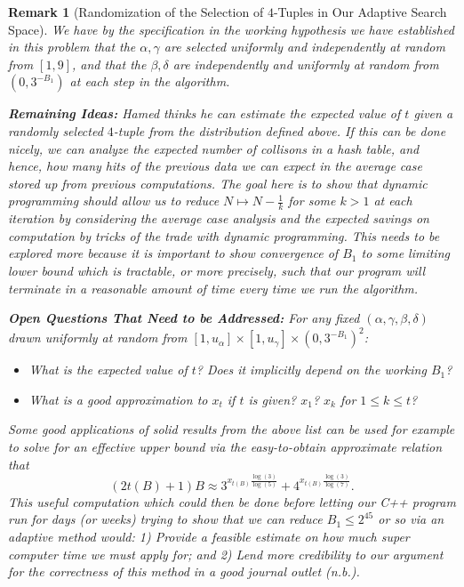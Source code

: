 \documentclass[12pt]{article}
\newtheorem{remark}[theorem]{Remark}
\begin{document}
\begin{remark}[Randomization of the Selection of $4$-Tuples in Our Adaptive Search Space] 
We have by the specification in the working hypothesis we have established in this problem that the 
$\alpha,\gamma$ are selected uniformly and independently at random from $[1, 9]$, and that the 
$\beta,\delta$ are independently and uniformly at random from $(0, 3^{-B_1})$ at each step in the 
algorithm. 

\noindent
\textbf{Remaining Ideas:} 
Hamed thinks he can estimate the expected value of $t$ given a randomly selected $4$-tuple from the 
distribution defined above. If this can be done nicely, we can analyze the expected number of collisons in a 
hash table, and hence, how many hits of the previous data we can expect in the average case stored up from 
previous computations. \emph{The goal here is to show that dynamic programming should allow us to reduce 
$N \mapsto N-\frac{1}{k}$ for some $k > 1$ at each iteration by considering the average case analysis and the 
expected savings on computation by tricks of the trade with dynamic programming.} This needs to be 
explored more because it is important to show convergence of $B_1$ to some limiting lower bound which is 
tractable, or more precisely, such that our program will terminate in a reasonable amount of 
time every time we run the algorithm. 

\noindent
\textbf{Open Questions That Need to be Addressed:} 
For any fixed $(\alpha,\gamma,\beta,\delta)$ drawn uniformly at random from 
$[1,u_{\alpha}] \times [1,u_{\gamma}] \times (0,3^{-B_1})^2$: 
\begin{itemize} 
\item What is the expected value of $t$? Does it implicitly depend on the working $B_1$? 
\item What is a good approximation to $x_t$ if $t$ is given? $x_1$? $x_k$ for $1 \leq k \leq t$? 
\end{itemize} 
Some good applications of solid results from the above list can be used for example to solve for an 
effective upper bound via the easy-to-obtain approximate relation that 
\[
(2t(B)+1) B \approx 3^{x_{t(B)} \frac{\log(3)}{\log(5)}} + 4^{x_{t(B)} \frac{\log(3)}{\log(7)}}. 
\]
This useful computation which could then be done before letting our C++ program run for days (or weeks) 
trying to show that we can reduce $B_1 \leq 2^{45}$ or so via an adaptive method would: 
1) Provide a feasible estimate on how much super computer time we must apply for; and 2) Lend more 
credibility to our argument for the correctness of this method in a good journal outlet (n.b.). 
\end{remark} 
\end{document}

